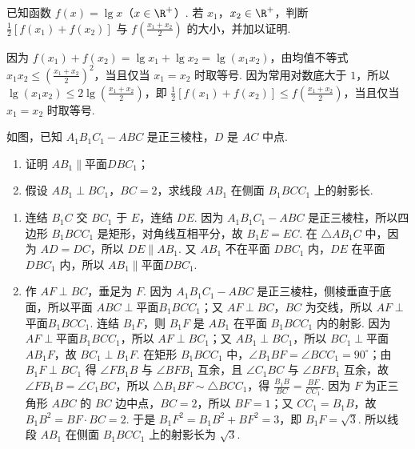 \documentclass[UTF8,a4paper,oneside,11pt]{ctexbook}
\begin{document}
\begin{problem}
已知函数 \(f(x)=\lg x\)（\(x\in\R^{+}\)）. 若 \(x_{1}\)，\(x_{2}\in\R^{+}\)，判断 \(\frac{1}{2}\left[f\left(x_{1}\right)+f\left(x_{2}\right)\right]\) 与 \(f\left(\frac{x_{1}+x_{2}}{2}\right)\) 的大小，并加以证明.
\end{problem}

\begin{solution}
因为 \(f\left(x_{1}\right)+f\left(x_{2}\right)=\lg x_{1}+\lg x_{2}=\lg\left(x_{1}x_{2}\right)\)，由均值不等式 \(x_{1}x_{2}\leq\left(\frac{x_{1}+x_{2}}{2}\right)^{2}\)，当且仅当 \(x_{1}=x_{2}\) 时取等号. 因为常用对数底大于 \(1\)，所以 \(\lg\left(x_{1}x_{2}\right)\leq 2\lg\left(\frac{x_{1}+x_{2}}{2}\right)\)，即 \(\frac{1}{2}\left[f\left(x_{1}\right)+f\left(x_{2}\right)\right]\leq f\left(\frac{x_{1}+x_{2}}{2}\right)\)，当且仅当 \(x_{1}=x_{2}\) 时取等号.
\end{solution}

\begin{problem}
如图，已知 \(A_{1}B_{1}C_{1}-ABC\) 是正三棱柱，\(D\) 是 \(AC\) 中点.
\begin{enumerate}
\item 证明 \(AB_{1}\parallel\)平面\(DBC_{1}\)；
\item 假设 \(AB_{1}\perp BC_{1}\)，\(BC=2\)，求线段 \(AB_{1}\) 在侧面 \(B_{1}BCC_{1}\) 上的射影长.
\end{enumerate}
\end{problem}

\begin{solution}
\begin{enumerate}
\item 连结 \(B_{1}C\) 交 \(BC_{1}\) 于 \(E\)，连结 \(DE\). 因为 \(A_{1}B_{1}C_{1}-ABC\) 是正三棱柱，所以四边形 \(B_{1}BCC_{1}\) 是矩形，对角线互相平分，故 \(B_{1}E=EC\). 在 \(\triangle AB_{1}C\) 中，因为 \(AD=DC\)，所以 \(DE\parallel AB_{1}\). 又 \(AB_{1}\) 不在平面 \(DBC_{1}\) 内，\(DE\) 在平面 \(DBC_{1}\) 内，所以 \(AB_{1}\parallel\)平面\(DBC_{1}\).
\item 作 \(AF\perp BC\)，垂足为 \(F\). 因为 \(A_{1}B_{1}C_{1}-ABC\) 是正三棱柱，侧棱垂直于底面，所以平面 \(ABC\perp\)平面\(B_{1}BCC_{1}\)；又 \(AF\perp BC\)，\(BC\) 为交线，所以 \(AF\perp\)平面\(B_{1}BCC_{1}\). 连结 \(B_{1}F\)，则 \(B_{1}F\) 是 \(AB_{1}\) 在平面 \(B_{1}BCC_{1}\) 内的射影. 因为 \(AF\perp\)平面\(B_{1}BCC_{1}\)，所以 \(AF\perp BC_{1}\)；又 \(AB_{1}\perp BC_{1}\)，所以 \(BC_{1}\perp\)平面\(AB_{1}F\)，故 \(BC_{1}\perp B_{1}F\). 在矩形 \(B_{1}BCC_{1}\) 中，\(\angle B_{1}BF=\angle BCC_{1}=90^{\circ}\)；由 \(B_{1}F\perp BC_{1}\) 得 \(\angle FB_{1}B\) 与 \(\angle BFB_{1}\) 互余，且 \(\angle C_{1}BC\) 与 \(\angle BFB_{1}\) 互余，故 \(\angle FB_{1}B=\angle C_{1}BC\)，所以 \(\triangle B_{1}BF\sim\triangle BCC_{1}\)，得 \(\frac{B_{1}B}{BC}=\frac{BF}{CC_{1}}\). 因为 \(F\) 为正三角形 \(ABC\) 的 \(BC\) 边中点，\(BC=2\)，所以 \(BF=1\)；又 \(CC_{1}=B_{1}B\)，故 \(B_{1}B^{2}=BF\cdot BC=2\). 于是 \(B_{1}F^{2}=B_{1}B^{2}+BF^{2}=3\)，即 \(B_{1}F=\sqrt{3}\). 所以线段 \(AB_{1}\) 在侧面 \(B_{1}BCC_{1}\) 上的射影长为 \(\sqrt{3}\).
\end{enumerate}
\end{solution}
\end{document}
